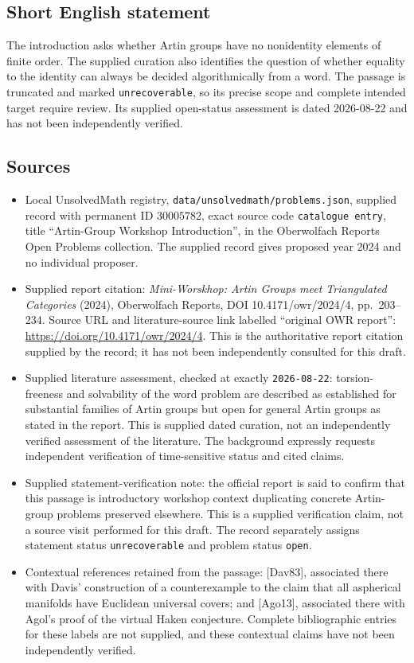 \documentclass[11pt]{article}
\begin{document}
\subsection{Short English statement}
The introduction asks whether Artin groups have no nonidentity elements of finite order. The supplied curation also identifies the question of whether equality to the identity can always be decided algorithmically from a word. The passage is truncated and marked \texttt{unrecoverable}, so its precise scope and complete intended target require review. Its supplied open-status assessment is dated 2026-08-22 and has not been independently verified.
\subsection{Sources}
\begin{itemize}
\item Local UnsolvedMath registry, \texttt{data/unsolvedmath/problems.json}, supplied record with permanent ID \(30005782\), exact source code \texttt{catalogue entry}, title ``Artin-Group Workshop Introduction'', in the Oberwolfach Reports Open Problems collection. The supplied record gives proposed year 2024 and no individual proposer.
\item Supplied report citation: \emph{Mini-Worskhop: Artin Groups meet Triangulated Categories} (2024), Oberwolfach Reports, DOI 10.4171/owr/2024/4, pp.\ 203--234. Source URL and literature-source link labelled ``original OWR report'': \url{https://doi.org/10.4171/owr/2024/4}. This is the authoritative report citation supplied by the record; it has not been independently consulted for this draft.
\item Supplied literature assessment, checked at exactly \texttt{2026-08-22}: torsion-freeness and solvability of the word problem are described as established for substantial families of Artin groups but open for general Artin groups as stated in the report. This is supplied dated curation, not an independently verified assessment of the literature. The background expressly requests independent verification of time-sensitive status and cited claims.
\item Supplied statement-verification note: the official report is said to confirm that this passage is introductory workshop context duplicating concrete Artin-group problems preserved elsewhere. This is a supplied verification claim, not a source visit performed for this draft. The record separately assigns statement status \texttt{unrecoverable} and problem status \texttt{open}.
\item Contextual references retained from the passage: [Dav83], associated there with Davis' construction of a counterexample to the claim that all aspherical manifolds have Euclidean universal covers; and [Ago13], associated there with Agol's proof of the virtual Haken conjecture. Complete bibliographic entries for these labels are not supplied, and these contextual claims have not been independently verified.
\end{itemize}
\end{document}
